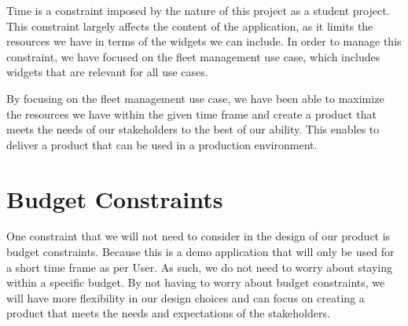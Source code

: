Time is a constraint imposed by the nature of this project as a student project. This constraint largely affects the content of the application, as it limits the resources we have in terms of the widgets we can include. In order to manage this constraint, we have focused on the fleet management use case, which includes widgets that are relevant for all use cases.

By focusing on the fleet management use case, we have been able to maximize the resources we have within the given time frame and create a product that meets the needs of our stakeholders to the best of our ability. This enables to deliver a product that can be used in a production environment.



\section{Budget Constraints}

One constraint that we will not need to consider in the design of our product is budget constraints. Because this is a demo application that will only be used for a short time frame as per User. As such, we do not need to worry about staying within a specific budget. By not having to worry about budget constraints, we will have more flexibility in our design choices and can focus on creating a product that meets the needs and expectations of the stakeholders.